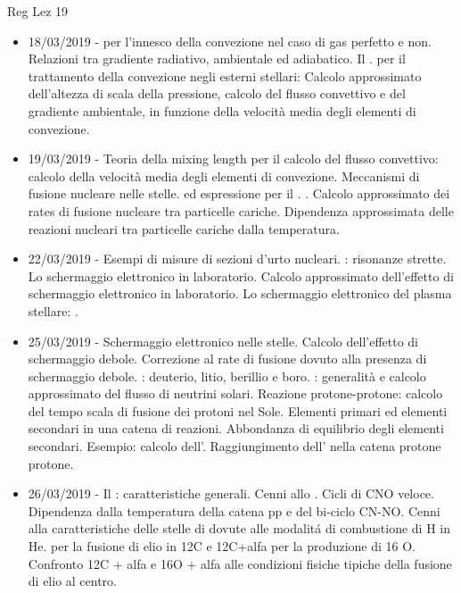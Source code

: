 \begin{frame}[allowframebreaks]{Reg Lez 19}
\begin{itemize}
\item 18/03/2019 -  per l'innesco della convezione nel caso di gas perfetto e non. Relazioni tra gradiente radiativo, ambientale ed adiabatico. Il .  per il trattamento della convezione negli esterni stellari: Calcolo approssimato dell'altezza di scala della pressione, calcolo del flusso convettivo e del gradiente ambientale, in funzione della velocità media degli elementi di convezione.
\item 19/03/2019 - Teoria della mixing length per il calcolo del flusso convettivo: calcolo della velocità media degli elementi di convezione. Meccanismi di fusione nucleare nelle stelle.  ed espressione per il . . Calcolo approssimato dei rates di fusione nucleare tra particelle cariche. Dipendenza approssimata delle reazioni nucleari tra particelle cariche dalla temperatura.
\item 22/03/2019 - Esempi di misure di sezioni d'urto nucleari. : risonanze strette. Lo schermaggio elettronico in laboratorio. Calcolo approssimato dell'effetto di schermaggio elettronico in laboratorio. Lo schermaggio elettronico del plasma stellare: .
\item 25/03/2019 - Schermaggio elettronico nelle stelle. Calcolo dell'effetto di schermaggio debole. Correzione al rate di fusione dovuto alla presenza di schermaggio debole. : deuterio, litio, berillio e boro. : generalità e calcolo approssimato del flusso di neutrini solari. Reazione protone-protone: calcolo del tempo scala di fusione dei protoni nel Sole. Elementi primari ed elementi secondari in una catena di reazioni. Abbondanza di equilibrio degli elementi secondari. Esempio: calcolo dell'. Raggiungimento dell' nella catena protone protone.
\item 26/03/2019 - Il : caratteristiche generali. Cenni allo . Cicli di CNO veloce. Dipendenza dalla temperatura della catena pp e del bi-ciclo CN-NO. Cenni alla caratteristiche delle stelle di  dovute alle modalit\'a di combustione di H in He.  per la fusione di elio in 12C e 12C+alfa per la produzione di 16 O. Confronto 12C + alfa e 16O + alfa alle condizioni fisiche tipiche della fusione di elio al centro.

\end{itemize}
\end{frame}
